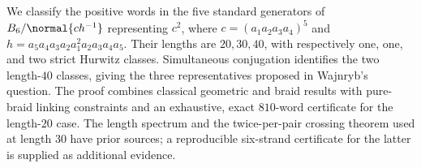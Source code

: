 
We classify the positive words in the five standard generators of
\(B_6/\normal{ch^{-1}}\) representing \(c^2\), where
\(c=(a_1a_2a_3a_4)^5\) and \(h=a_5a_4a_3a_2a_1^2a_2a_3a_4a_5\).
Their lengths are \(20,30,40\), with respectively one, one, and two
strict Hurwitz classes. Simultaneous conjugation identifies the two
length-\(40\) classes, giving the three representatives proposed in
Wajnryb's question. The proof combines classical geometric and braid
results with pure-braid linking constraints and an exhaustive,
exact \(810\)-word certificate for the length-\(20\) case.
The length spectrum and the twice-per-pair crossing theorem used at
length \(30\) have prior sources; a reproducible six-strand certificate
for the latter is supplied as additional evidence.
